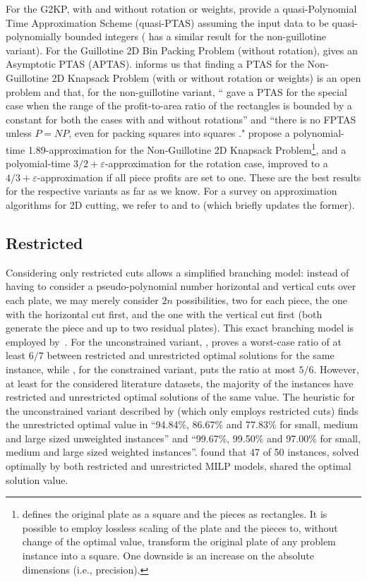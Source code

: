 \documentclass[ppgc,tese,english,formais,babel]{iiufrgs}
\begin{document}
For the G2KP, with and without rotation or weights, \citet{abed:2015} provide a quasi-Polynomial Time Approximation Scheme (quasi-PTAS) assuming the input data to be quasi-polynomially bounded integers (\citet{anna:2015:quasi} has a similar result for the non-guillotine variant).
For the Guillotine 2D Bin Packing Problem (without rotation), \citet{bansal:2005} gives an Asymptotic PTAS (APTAS).
\citet{christensen:2017} informs us that finding a PTAS for the Non-Guillotine 2D Knapsack Problem (with or without rotation or weights) is an open problem and that, for the non-guillotine variant, ``\citet{bansal:2009} gave a PTAS for the special case when the range of the profit-to-area ratio of the rectangles is bounded by a constant for both the cases with and without rotations'' and ``there is no FPTAS unless \(P = NP\), even for packing squares into squares \citep{leung:1990}."
\citet{galvez:2017} propose a polynomial-time 1.89-approximation for the Non-Guillotine 2D Knapsack Problem\footnote{\citet{galvez:2017} defines the original plate as a square and the pieces as rectangles. It is possible to employ lossless scaling of the plate and the pieces to, without change of the optimal value, transform the original plate of any problem instance into a square. One downside is an increase on the absolute dimensions (i.e., precision).}, and a polyomial-time \(3/2 + \varepsilon\)-approximation for the rotation case, improved to a \(4/3 + \varepsilon\)-approximation if all piece profits are set to one.
These are the best results for the respective variants as far as we know.
For a survey on approximation algorithms for 2D cutting, we refer to \citet{christensen:2017} and to \citet{iori:2020} (which briefly updates the former).

\subsection{Restricted}

Considering only restricted cuts allows a simplified branching model: instead of having to consider a pseudo-polynomial number horizontal and vertical cuts over each plate, we may merely consider \(2n\) possibilities, two for each piece, the one with the horizontal cut first, and the one with the vertical cut first (both generate the piece and up to two residual plates).
This exact branching model is employed by~\citet{silva:2010}.
For the unconstrained variant, \citet{song:2010}, proves a worst-case ratio of at least \(6/7\) between restricted and unrestricted optimal solutions for the same instance, while \citet{furini:2016}, for the constrained variant, puts the ratio  at most \(5/6\).
However, at least for the considered literature datasets, the majority of the instances have restricted and unrestricted optimal solutions of the same value.
The heuristic for the unconstrained variant described by \citet{song:2010} (which only employs restricted cuts) finds the unrestricted optimal value in ``94.84\%, 86.67\% and 77.83\% for small, medium and large sized unweighted instances'' and ``99.67\%, 99.50\% and 97.00\% for small, medium and large sized weighted instances''.
\citet{furini:2016} found that 47 of 50 instances, solved optimally by both restricted and unrestricted MILP models, shared the optimal solution value.
\end{document}
